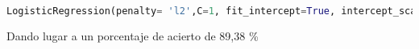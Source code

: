 \begin{lstlisting}[language=python, breaklines]
	LogisticRegression(penalty= 'l2',C=1, fit_intercept=True, intercept_scaling=0.1, tol=0.001, class_weight=None)
\end{lstlisting}

Dando lugar a un porcentaje de acierto de 89,38 \%








